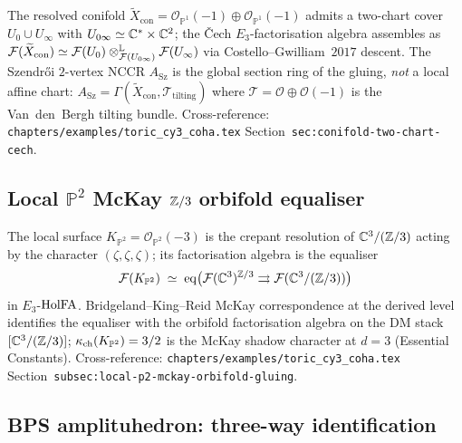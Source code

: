 \begin{theorem}\ClaimStatusTheorem
\label{wn:thm:plat-conifold-cech}
The resolved conifold $\widetilde{X}_{\mathrm{con}} = \mathcal{O}_{\mathbb{P}^1}(-1)
\oplus \mathcal{O}_{\mathbb{P}^1}(-1)$ admits a two-chart cover
$U_0 \cup U_\infty$ with $U_{0\infty} \simeq \mathbb{C}^* \times \mathbb{C}^2$; the
\v{C}ech $E_3$-factorisation algebra assembles as
$\mathcal{F}(\widetilde{X}_{\mathrm{con}}) \simeq
\mathcal{F}(U_0) \otimes^{\mathbb{L}}_{\mathcal{F}(U_{0\infty})} \mathcal{F}(U_\infty)$
via Costello--Gwilliam~$2017$ descent. The Szendr\H{o}i $2$-vertex NCCR
$A_{\mathrm{Sz}}$ is the global section ring of the gluing, \emph{not} a
local affine chart: $A_{\mathrm{Sz}} = \Gamma(\widetilde{X}_{\mathrm{con}},
\mathcal{T}_{\mathrm{tilting}})$ where $\mathcal{T} = \mathcal{O} \oplus
\mathcal{O}(-1)$ is the Van~den~Bergh tilting bundle. Cross-reference:
\texttt{chapters/examples/toric\_cy3\_coha.tex}
Section~\texttt{sec:conifold-two-chart-cech}.
\end{theorem}

\subsection{Local $\mathbb{P}^2$ McKay $\mathbb{Z}/3$ orbifold equaliser}
\label{wn:subsec:plat-local-p2-mckay}

\begin{theorem}\ClaimStatusTheorem
\label{wn:thm:plat-local-p2-mckay}
The local surface $K_{\mathbb{P}^2} = \mathcal{O}_{\mathbb{P}^2}(-3)$ is
the crepant resolution of $\mathbb{C}^3/(\mathbb{Z}/3)$ acting by the character
$(\zeta, \zeta, \zeta)$; its factorisation algebra is the equaliser
\[
\mathcal{F}(K_{\mathbb{P}^2}) \;\simeq\;
\mathrm{eq}\bigl(\mathcal{F}(\mathbb{C}^3)^{\mathbb{Z}/3} \rightrightarrows
\mathcal{F}(\mathbb{C}^3/(\mathbb{Z}/3))\bigr)
\]
in $E_3$-$\mathrm{HolFA}$. Bridgeland--King--Reid McKay correspondence at the
derived level identifies the equaliser with the orbifold factorisation
algebra on the DM stack $[\mathbb{C}^3/(\mathbb{Z}/3)]$; $\kappa_{\mathrm{ch}}(K_{\mathbb{P}^2}) = 3/2$
is the McKay shadow character at $d = 3$ (Essential Constants). Cross-reference:
\texttt{chapters/examples/toric\_cy3\_coha.tex}
Section~\texttt{subsec:local-p2-mckay-orbifold-gluing}.
\end{theorem}

\subsection{BPS amplituhedron: three-way identification}
\label{wn:subsec:plat-bps-amplituhedron}

